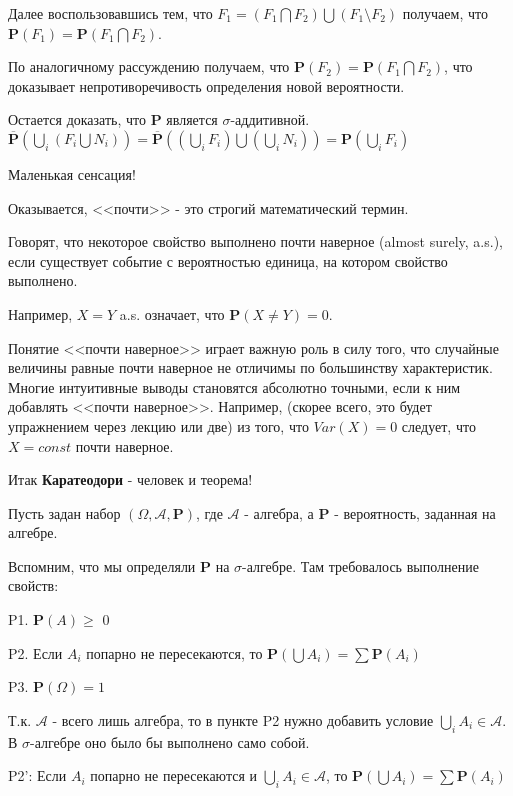 {Далее воспользовавшись тем, что $F_{1}=(F_{1}\bigcap
F_{2})\bigcup(F_{1} \setminus F_{2})$ получаем, что
$\mathbf{P}(F_{1})=\mathbf{P}(F_{1}\bigcap F_{2})$.

По аналогичному рассуждению получаем, что
$\mathbf{P}(F_{2})=\mathbf{P}(F_{1}\bigcap F_{2})$, что доказывает
непротиворечивость определения новой вероятности.

Остается доказать, что $\mathbf{P}$ является $\sigma$-аддитивной.
$\mathbf{\overline{P}}(\bigcup_{i}(F_{i}\bigcup
N_{i}))=\mathbf{\overline{P}}((\bigcup_{i}
F_{i})\bigcup(\bigcup_{i} N_{i}))=\mathbf{P}(\bigcup_{i} F_{i})$


Маленькая сенсация!

Оказывается, <<почти>> - это строгий математический термин.

Говорят, что некоторое свойство выполнено почти наверное (almost
surely, a.s.), если существует событие с вероятностью единица, на
котором свойство выполнено.

Например, $X=Y$ a.s. означает, что $\mathbf{P}(X\neq Y)=0$.

Понятие <<почти наверное>> играет важную роль в силу того, что
случайные величины равные почти наверное не отличимы по
большинству характеристик. Многие интуитивные выводы становятся
абсолютно точными, если к ним добавлять <<почти наверное>>.
Например, (скорее всего, это будет упражнением через лекцию или
две) из того, что $Var(X)=0$ следует, что $X=const$ почти
наверное.


Итак \textbf{Каратеодори} - человек и теорема!

Пусть задан набор $(\Omega,\mathcal{A},\mathbf{P})$, где
$\mathcal{A}$ - алгебра, а $\mathbf{P}$ - вероятность, заданная на
алгебре.

Вспомним, что мы определяли $\mathbf{P}$ на $\sigma$-алгебре. Там
требовалось выполнение свойств:

P1. $\mathbf{P}(A)\geq$ $0$

P2. Если $A_{i}$ попарно не пересекаются, то $\mathbf{P}(\bigcup
A_{i})=\sum \mathbf{P}(A_{i})$

P3. $\mathbf{P}(\Omega)=1$

Т.к. $\mathcal{A}$ - всего лишь алгебра, то в пункте P2 нужно
добавить условие $\bigcup_{i} A_{i} \in \mathcal{A}$. В
$\sigma$-алгебре оно было бы выполнено само собой.

P2': Если $A_{i}$ попарно не пересекаются и $\bigcup_{i} A_{i} \in
\mathcal{A}$, то $\mathbf{P}(\bigcup A_{i})=\sum
\mathbf{P}(A_{i})$






}
